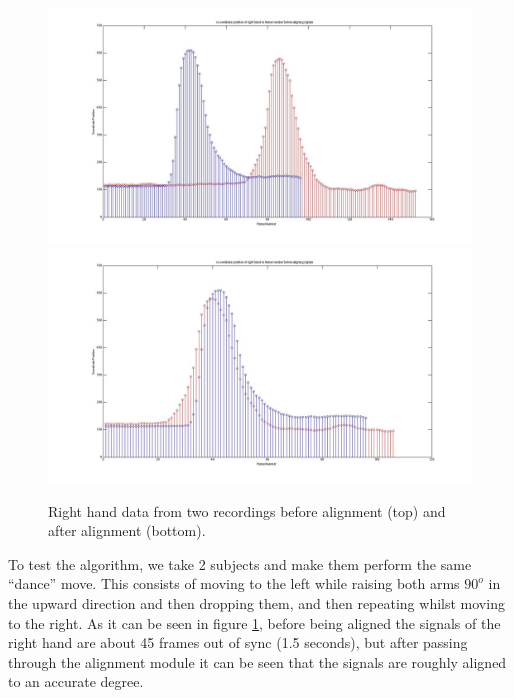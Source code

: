 \documentclass[11pt,a4paper]{article}
\begin{document}
\begin{figure}[h]
\centering
\includegraphics[scale=0.15]{Initial_Frame_Det_Before.jpg}
\includegraphics[scale=0.15]{Initial_Frame_Det_After.jpg}
\caption{Right hand data from two recordings before alignment (top) and after alignment (bottom).}
\label{pre_post_alginment}
\end{figure}
\noindent
To test the algorithm, we take 2 subjects and make them perform the same ``dance'' move. This consists of moving to the left while raising both arms $90^o$ in the upward direction and then dropping them, and then repeating whilst moving to the right. 
As it can be seen in figure \ref{pre_post_alginment}, before being aligned the signals of the right hand are about 45 frames out of sync (1.5 seconds), but after passing through the alignment module it can be seen that the signals are roughly aligned to an accurate degree. 

\clearpage
\end{document}
